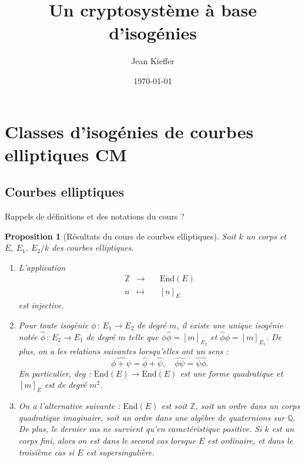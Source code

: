 \documentclass[11pt,a4paper]{article}
\title{Un cryptosystème à base d'isogénies}
\author{Jean Kieffer}
\date{\today}
\newcommand{\Z}{\mathbb{Z}}
\newcommand{\Q}{\mathbb{Q}}
\newcommand{\vers}{\longrightarrow}
\newcommand{\End}{\mathrm{End}}
\newcommand{\de}{\,:\,}
\newtheorem*{prop}{Proposition}
\theoremstyle{definition}
\begin{document}
\maketitle
\tableofcontents
\newpage

\section{Classes d'isogénies de courbes elliptiques CM}

\subsection{Courbes elliptiques}

Rappels de définitions et des notations du cours ?

\begin{prop}[Résultats du cours de courbes elliptiques]
Soit $k$ un corps et $E,\ E_1,\ E_2/k$ des courbes elliptiques. 
\begin{enumerate}

\item L'application
$$\begin{aligned}
&\Z &\longrightarrow&\ &\End(E) &\\
&n &\longmapsto& &[n]_E \ \ &
\end{aligned}$$
est injective.

\item Pour toute isogénie $\phi\de E_1\vers E_2$ de degré $m$, il existe une unique isogénie notée $\widehat{\phi}\de E_2\vers E_1$ de degré $m$ telle que $\phi\widehat{\phi}=[m]_{E_2}$ et $\widehat{\phi}\phi=[m]_{E_1}$.
De plus, on a les relations suivantes lorsqu'elles ont un sens :
$$\widehat{\phi+\psi}=\widehat{\phi}+\widehat{\psi},\quad \widehat{\phi\psi}=\widehat{\psi}\widehat{\phi}.$$
En particulier, deg : $\End(E)\vers \End(E)$ est une forme quadratique et $[m]_E$ est de degré $m^2$.

\item On a l'alternative suivante : $\End(E)$ est soit $\Z$, soit un ordre dans un corps quadratique imaginaire, soit un ordre dans une algèbre de quaternions sur $\Q$. De plus, le dernier cas ne survient qu'en caractéristique positive. Si $k$ est un corps fini, alors on est dans le second cas lorsque $E$ est ordinaire, et dans le troisième cas si $E$ est supersingulière.

\end{enumerate}
\end{prop}
\end{document}
